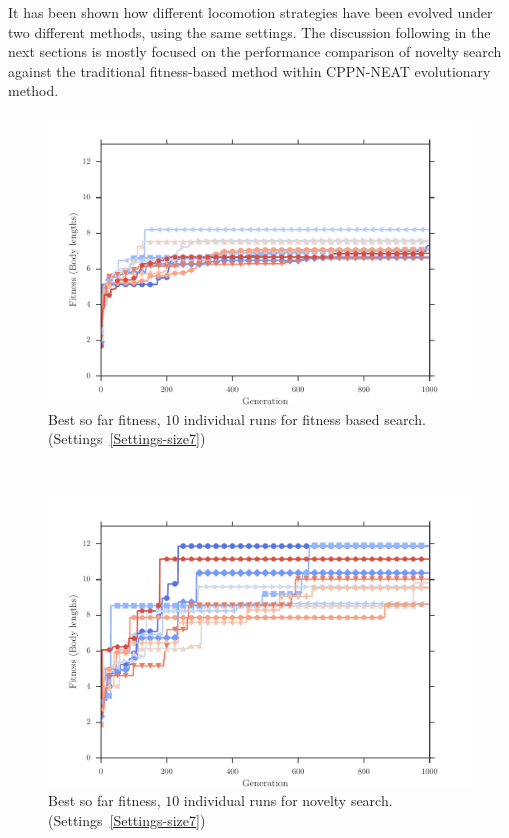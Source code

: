 It has been shown how different locomotion strategies have been evolved under two different methods, using the same settings. The discussion following in the next sections is mostly focused on the performance comparison of novelty search against the traditional fitness-based method within CPPN-NEAT evolutionary method.





\clearpage


\begin{figure}[ht!]
\centering
\includegraphics[width=1.0\textwidth]{../Figures/Results/indRunnAvgSize7Fitness.pdf}
\caption{Best so far fitness, $10$ individual runs for fitness based search. (Settings~\ref{Settings-size7})}
\label{fig:indRunsAvgSize10Fitness}
\end{figure}
~
\begin{figure}[ht!]
\centering
\includegraphics[width=1.0\textwidth]{../Figures/Results/indRunnAvgSize7Novelty.pdf}
\caption{Best so far fitness, $10$ individual runs for novelty search. (Settings~\ref{Settings-size7})}
\label{fig:indRunnAvgSize10Novelty}
\end{figure}

